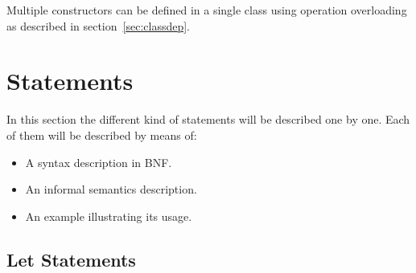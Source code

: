 \documentclass[\pformat,12pt]{article}
\begin{document}
Multiple constructors can be defined in a single class using
operation overloading as described in section~\ref{sec:classdep}. 


\section{Statements}\label{sec:stmt}

In this section the different kind of statements will be described
one by one. Each of them will be described by means of:
\begin{itemize}
\item A syntax description in BNF.
\item An informal semantics description.
\item An example illustrating its usage.
\end{itemize}

\subsection{Let Statements}\label{letstmt}
\end{document}
